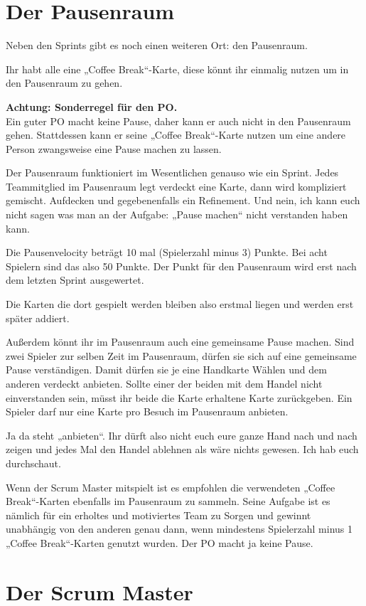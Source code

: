 \documentclass[10pt,a4paper]{article}
\begin{document}
\section{Der Pausenraum}

Neben den Sprints gibt es noch einen weiteren Ort: den Pausenraum.

Ihr habt alle eine „Coffee Break“-Karte, diese könnt ihr einmalig nutzen um in den Pausenraum zu gehen.

\textbf{Achtung: Sonderregel für den PO.}\\
Ein guter PO macht keine Pause, daher kann er auch nicht in den Pausenraum gehen. Stattdessen kann er seine „Coffee Break“-Karte nutzen um eine andere Person zwangsweise eine Pause machen zu lassen.

Der Pausenraum funktioniert im Wesentlichen genauso wie ein Sprint. Jedes Teammitglied im Pausenraum legt verdeckt eine Karte, dann wird kompliziert gemischt. Aufdecken und gegebenenfalls ein Refinement. Und nein, ich kann euch nicht sagen was man an der Aufgabe: „Pause machen“ nicht verstanden haben kann.

Die Pausenvelocity beträgt 10 mal (Spielerzahl minus 3) Punkte. Bei acht Spielern sind das also 50 Punkte. Der Punkt für den Pausenraum wird erst nach dem letzten Sprint ausgewertet.

Die Karten die dort gespielt werden bleiben also erstmal liegen und werden erst später addiert.

Außerdem könnt ihr im Pausenraum auch eine gemeinsame Pause machen. Sind zwei Spieler zur selben Zeit im Pausenraum, dürfen sie sich auf eine gemeinsame Pause verständigen. Damit dürfen sie je eine Handkarte Wählen und dem anderen verdeckt anbieten. Sollte einer der beiden mit dem Handel nicht einverstanden sein, müsst ihr beide die Karte erhaltene Karte zurückgeben. Ein Spieler darf nur eine Karte pro Besuch im Pausenraum anbieten.

Ja da steht „anbieten“. Ihr dürft also nicht euch eure ganze Hand nach und nach zeigen und jedes Mal den Handel ablehnen als wäre nichts gewesen. Ich hab euch durchschaut.

Wenn der Scrum Master mitspielt ist es empfohlen die verwendeten „Coffee Break“-Karten ebenfalls im Pausenraum zu sammeln. Seine Aufgabe ist es nämlich für ein erholtes und motiviertes Team zu Sorgen und gewinnt unabhängig von den anderen genau dann, wenn mindestens Spielerzahl minus 1 „Coffee Break“-Karten genutzt wurden. Der PO macht ja keine Pause.

\section{Der Scrum Master}
\end{document}
